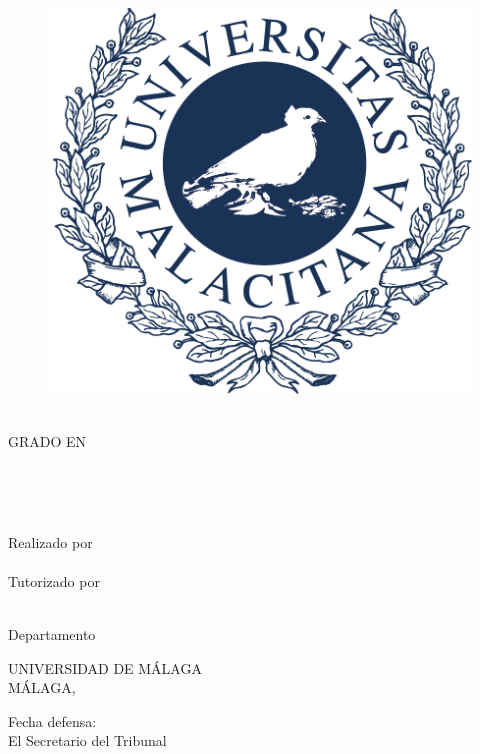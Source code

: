\begin{center}
    \begin{figure}[h]
        \centering
        \includegraphics[scale=0.2]{images/Logos/uma.png}
    \end{figure}

    \MakeUppercase{\facultad} \\
    GRADO EN \MakeUppercase{\grado} \\
    \vspace{3cm}
    
    {\large	\tituloes} \\
    \ifdef{\subtituloes}{
        \textit{\subtituloes} \\
    }{}
    \bigbreak
    
    {\large	\tituloen} \\
    \ifdef{\subtituloen}{
        \textit{\subtituloen} \\
    }{}
    \bigbreak
    
    Realizado por \\
    \textbf{\alumno} \\
    
    Tutorizado por \\
    \textbf{\tutor} \\
    
    Departamento \\
    \textbf{\departamento}
    \bigbreak
    
    UNIVERSIDAD DE MÁLAGA \\
    MÁLAGA, \MakeUppercase{\fecha}
\end{center}

\vfill

Fecha defensa: \\
El Secretario del Tribunal
